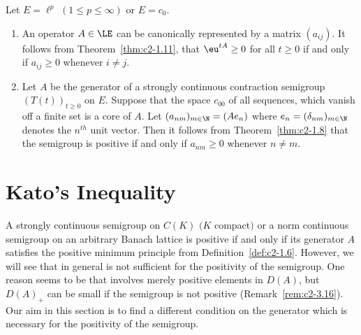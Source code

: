 \begin{examples}\label{ex:c2-1.13}
%
Let $E = \ell^p$ $(1 \leq p \leq \infty)$ or $E = c_{0}$.
\begin{enumerate}[\upshape (i), wide, labelindent=.25em] %
\item \label{ex:c2-1.13-1}
An operator $A \in \LE$ can be canonically represented by a matrix $(a_{ij})$. 
It follows from Theorem~\ref{thm:c2-1.11}, that $\eu^{tA} \geq 0$ for all $t \geq 0$ if and only if\/ $a_{ij} \geq 0$ whenever $i \neq j$.
\item \label{ex:c2-1.13-2}
Let $A$ be the generator of a strongly continuous contraction semigroup $(T(t))_{t \geq 0}$ on $E$.
Suppose that the space $c_{00}$ of all sequences, which vanish off a finite set is a core of\/ $A$.
Let $(a_{nm})_{m \in \N} = (Ae_{n})$ where $e_{n} = (\delta_{nm})_{m \in \N}$ denotes the $n^{th}$ unit vector.
Then it follows from Theorem~\ref{thm:c2-1.8}   that the semigroup is positive if and only if\/ $a_{nm} \geq 0$ whenever $n \neq m$.
\end{enumerate}
\end{examples}
\section{Kato's Inequality} \label{sec:c2-2}
%
A strongly continuous semigroup on $C(K)$ $(K$ compact$)$ or a norm continuous semigroup on an arbitrary Banach lattice is positive if and only if its generator $A$ satisfies the positive minimum principle  from Definition~\ref{def:c2-1.6}.
However, we will see that in general  is not sufficient for the positivity of the semigroup.
One reason seems to be that  involves merely positive elements in $D(A)$, but $D(A)_{+}$ can be small if the semigroup is not positive (\cf Remark~\ref{rem:c2-3.16}).
Our aim in this section is to find a different condition on the generator which is necessary for the positivity of the semigroup.

